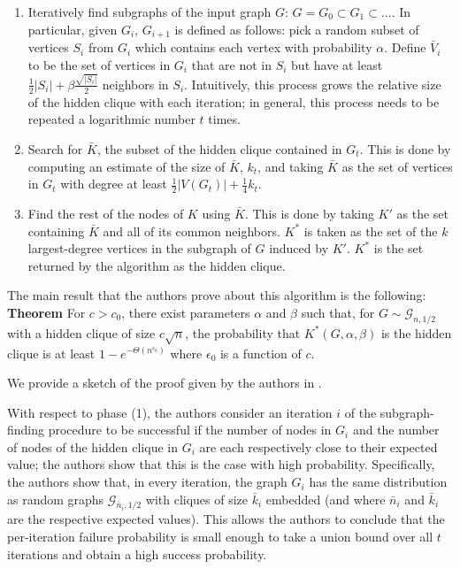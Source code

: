 \documentclass{article}
\theoremstyle{definition}
\begin{document}
\begin{enumerate}
\item{Iteratively find subgraphs of the input graph $G$:
$G=G_0 \subset G_1 \subset ...$.  In particular, given $G_i$, 
$G_{i+1}$ is defined as follows: pick a random subset of vertices 
$S_i$ from $G_i$ which contains each vertex with probability $\alpha$.  
Define $\bar{V}_i$ to be the set of vertices in $G_i$ that are not 
in $S_i$ but have at least $\frac{1}{2}\lvert S_i \rvert + 
\beta\frac{\sqrt{\lvert S_i \rvert}}{2}$ neighbors in $S_i$.  
Intuitively, this process grows the relative size of the 
hidden clique with each iteration; in general, this process needs 
to be repeated a logarithmic number $t$ times.}
\item{Search for $\bar{K}$, the subset of the hidden clique 
contained in $G_t$.  This is done by computing an estimate 
of the size of $\bar{K}$, $k_t$, and taking $\bar{K}$ as 
the set of vertices in $G_t$ with degree at least 
$\frac{1}{2}\lvert V(G_t) \rvert + \frac{1}{4}k_t$.}
\item{Find the rest of the nodes of $K$ using $\bar{K}$.
This is done by taking $K'$ as the set containing $\bar{K}$
and all of its common neighbors.  $K^*$ is taken as the 
set of the $k$ largest-degree vertices in the subgraph of $G$ 
induced by $K'$.  $K^*$ is the set returned by the algorithm 
as the hidden clique.}
\end{enumerate}

\noindent The main result that the authors prove about this 
algorithm is the following:
\newline\newline
\noindent \textbf{Theorem } For $c > c_0$, there exist parameters
$\alpha$ and $\beta$ such that, for $G\sim\mathcal{G}_{n,1/2}$ with 
a hidden clique of size $c\sqrt{n}$, the probability that 
$K^*(G,\alpha,\beta)$ is the hidden clique is at least 
$1-e^{-\Theta(n^{\epsilon_0})}$ where $\epsilon_0$ is a function 
of $c$.

\noindent We provide a sketch of the proof given by the authors in 
\cite{Combinatoric}.  

With respect to phase (1), the 
authors consider an iteration $i$ of the subgraph-finding procedure
to be successful if the number of nodes in $G_i$ and the 
number of nodes of the hidden clique in $G_i$ are each respectively 
close to their expected value; the authors show that this is 
the case with high probability.  Specifically, the authors 
show that, in every iteration, the graph $G_i$ has the same 
distribution as random graphs $\mathcal{G}_{\bar{n}_i,1/2}$ 
with cliques of size $\bar{k}_i$ embedded (and where 
$\bar{n}_i$ and $\bar{k}_i$ are the respective expected values).
This allows the authors to conclude that the per-iteration 
failure probability is small enough to take a union bound 
over all $t$ iterations and obtain a high success probability.
\end{document}
